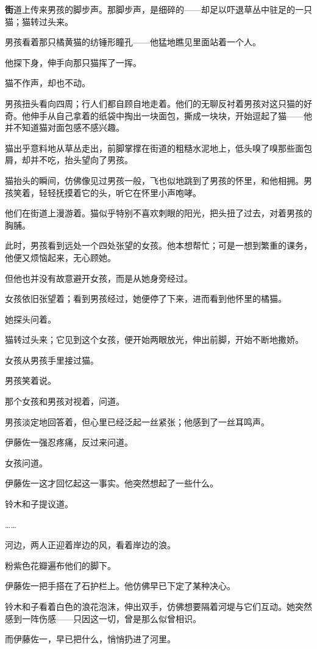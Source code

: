 
\AddSymbolsA
\pagecolor{OliveGreen!30!gray}
\color{white}
\quad\quad \lettrine[,lraise=0.2,lhang=0.5]{\textbf{街}}{道}上传来男孩的脚步声。那脚步声，是细碎的——却足以吓退草丛中驻足的一只猫；猫转过头来。

男孩看着那只橘黄猫的纺锤形瞳孔——他猛地瞧见里面站着一个人。

他探下身，伸手向那只猫挥了一挥。

猫不作声，却也不动。

男孩扭头看向四周；行人们都自顾自地走着。他们的无聊反衬着男孩对这只猫的好奇。他伸手从自己拿着的纸袋中掏出一块面包，撕成一块块，开始逗起了猫——他并不知道猫对面包感不感兴趣。

猫出乎意料地从草丛走出，前脚掌撑在街道的粗糙水泥地上，低头嗅了嗅那些面包屑，却并不吃，抬头望向了男孩。

猫抬头的瞬间，仿佛像见过男孩一般，飞也似地跳到了男孩的怀里，和他相拥。男孩笑着，轻轻抚摸着它的头，听它在怀里小声咆哮。

他们在街道上漫游着。猫似乎特别不喜欢刺眼的阳光，把头扭了过去，对着男孩的胸脯。

此时，男孩看到远处一个四处张望的女孩。他本想帮忙；可是一想到繁重的课务，他便又烦恼起来，无心顾她。

但他也并没有故意避开女孩，而是从她身旁经过。

女孩依旧张望着；看到男孩经过，她便停了下来，进而看到他怀里的橘猫。

她探头问着。

猫转过头来；它见到这个女孩，便开始两眼放光，伸出前脚，开始不断地撒娇。

女孩从男孩手里接过猫。

男孩笑着说。

那个女孩和男孩对视着，问道。

男孩淡定地回答着，但心里已经泛起一丝紧张；他感到了一丝耳鸣声。

伊藤佐一强忍疼痛，反过来问道。

女孩问道。

伊藤佐一这才回忆起这一事实。他突然想起了一些什么。

铃木和子提议道。

……

河边，两人正迎着岸边的风，看着岸边的浪。

粉紫色花瓣遍布他们的脚下。

伊藤佐一把手搭在了石护栏上。他仿佛早已下定了某种决心。

铃木和子看着白色的浪花泡沫，伸出双手，仿佛想要隔着河堤与它们互动。她突然感到一阵伤感——只因这一切，曾是那么似曾相识。

而伊藤佐一，早已把什么，悄悄扔进了河里。



\cleardoublepage

\thispagestyle{empty}
\pagecolor{white}
\color{black}

\vspace*{0.3\textheight}

